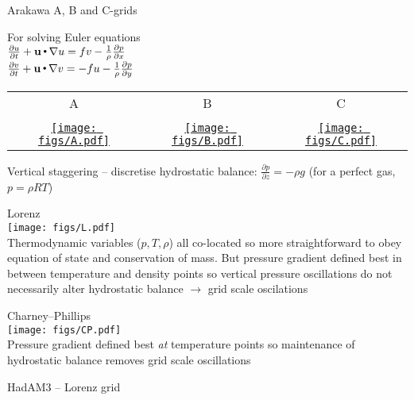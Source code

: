 \begin{slide}{Arakawa A, B and C-grids}

For solving Euler equations\\
$\frac{\partial u}{\partial t} + \mathbf u\,{\scriptscriptstyle \stackrel{\bullet}{{}}}\,\nabla{u}
= fv - \frac{1}{\rho}\frac{\partial p}{\partial x}$\\
$\frac{\partial v}{\partial t} + \mathbf u\,{\scriptscriptstyle \stackrel{\bullet}{{}}}\,\nabla{v}
= -fu - \frac{1}{\rho}\frac{\partial p}{\partial y}$\\

\begin{tabular}{ccc}
A & B & C \\ \vspace{12pt} \\
\href{run:../2dSWE/A.gif}
{\texttt{[image: figs/A.pdf]}}
&
\href{run:../2dSWE/B.gif}
{\texttt{[image: figs/B.pdf]}}
&
\href{run:../2dSWE/C.gif}
{\texttt{[image: figs/C.pdf]}}
\end{tabular}
\vspace{4in}
\end{slide}


\begin{slide}

\begin{list1}
\item Vertical staggering -- discretise hydrostatic balance: $\frac{\partial p}{\partial z} = -\rho g$ (for a perfect gas, $p = \rho RT$)

\begin{minipage}[t]{0.48\linewidth}\raggedright
{\centering
Lorenz \\
\texttt{[image: figs/L.pdf]}
}\\
Thermodynamic variables ($p, T, \rho$) all co-located so more straightforward to obey equation of state and conservation of mass. But pressure gradient defined best in between temperature and density points so vertical pressure oscillations do not necessarily alter hydrostatic balance $\rightarrow$ grid scale oscilations
\end{minipage}
\hfill
\begin{minipage}[t]{0.48\linewidth}\raggedright
{\centering
Charney--Phillips \\
\texttt{[image: figs/CP.pdf]}
}\\
Pressure gradient defined best {\it at} temperature points so maintenance of hydrostatic balance removes grid scale oscillations
\end{minipage}

\item HadAM3 -- Lorenz grid

\end{list1}

\end{slide}


